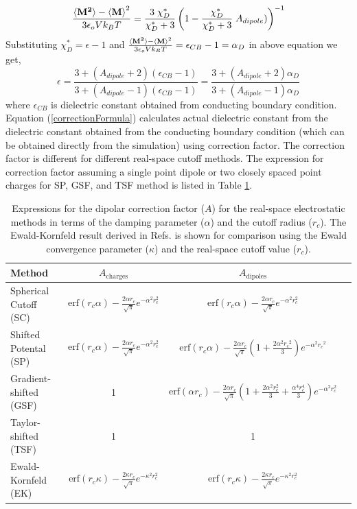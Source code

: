 \begin{equation}
\frac{\braket{\bf{M}^2}-{\braket{\bf{M}}}^2}{3 \epsilon_o V k_B T} = \frac{3\;\chi^*_D}{\chi^*_D + 3} \left(1-  \frac{\chi^*_D}{\chi^*_D + 3}\; A_{dipole})\right)^{-1}
\end{equation}
Substituting $\chi^*_D = \epsilon-1$ and $ \frac{\braket{\bf{M}^2}-{\braket{\bf{M}}}^2}{3 \epsilon_o V k_B T} = \epsilon_{CB}-1 = \alpha_D$ in above equation we get,
\begin{equation}
\epsilon = \frac{3+(A_{dipole} + 2)(\epsilon_{CB}-1)}{3+(A_{dipole} -1)(\epsilon_{CB}-1)} = \frac{3+(A_{dipole} + 2)\alpha_D}{3+(A_{dipole} -1)\alpha_D}
\label{correctionFormula}
\end{equation}
where $\epsilon_{CB}$ is dielectric constant obtained from conducting boundary condition. Equation (\ref{correctionFormula}) calculates actual dielectric constant from the dielectric constant obtained from the conducting boundary condition (which can be obtained directly from the simulation) using correction factor. The correction factor is different for different real-space cutoff methods. The expression for correction factor assuming a single point dipole or two closely spaced point charges for SP, GSF, and TSF method is listed in Table \ref{tab:A}.

\begin{table}
  \caption{Expressions for the dipolar correction factor ($A$) for the real-space electrostatic methods in terms of the damping parameter
    ($\alpha$) and the cutoff radius ($r_c$).  The Ewald-Kornfeld result 
    derived in Refs. \cite{Adams80,Adams81,NeumannI83} is shown for comparison using the Ewald convergence parameter ($\kappa$) and the real-space cutoff value ($r_c$). }
\label{tab:A}
{
\begin{tabular}{l|c|c|c|}
       
Method & $A_\mathrm{charges}$ & $A_\mathrm{dipoles}$  \\
\hline
Spherical Cutoff (SC) & $\mathrm{erf}(r_c \alpha) - \frac{2 \alpha r_c}{\sqrt{\pi}} e^{-\alpha^2 r_c^2}$ & $\mathrm{erf}(r_c \alpha) - \frac{2 \alpha r_c}{\sqrt{\pi}} e^{-\alpha^2 r_c^2}$ \\
Shifted Potental (SP) & $ \mathrm{erf}(r_c \alpha) - \frac{2 \alpha r_c}{\sqrt{\pi}} e^{-\alpha^2 r_c^2}$ & $\mathrm{erf}(r_c \alpha) -\frac{2 \alpha r_c}{\sqrt{\pi}}\left(1+\frac{2\alpha^2 {r_c}^2}{3} \right)e^{-\alpha^2{r_c}^2} $\\
Gradient-shifted  (GSF) & 1 & $\mathrm{erf}(\alpha  r_c)-\frac{2 \alpha  r_c}{\sqrt{\pi}}  \left(1 + \frac{2 \alpha^2 r_c^2}{3} + \frac{\alpha^4 r_c^4}{3}\right)e^{-\alpha^2 r_c^2} $ \\
Taylor-shifted  (TSF) & 1 & 1 \\ 
Ewald-Kornfeld (EK) & $\mathrm{erf}(r_c \kappa) - \frac{2 \kappa r_c}{\sqrt{\pi}} e^{-\kappa^2 r_c^2}$ & $\mathrm{erf}(r_c \kappa) - \frac{2 \kappa r_c}{\sqrt{\pi}} e^{-\kappa^2 r_c^2}$ \\\hline
\end{tabular}
}
\end{table}    

